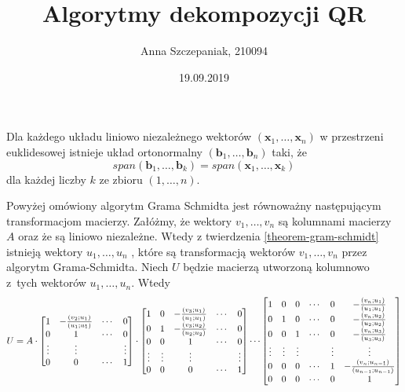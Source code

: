 \documentclass[notheorems]{beamer}
\author{Anna Szczepaniak, 210094}
\title{Algorytmy dekompozycji QR}
\date{19.09.2019}
\institute{Praca licencjacka przygotowana pod opieką dr inż. Piotra Kowalskiego}
\newcommand{\vr}[1]{\mathbf{#1}}
\newcommand{\mx}[1]{{#1}}
\newcommand{\proj}[2]{\frac{\scalar{#2}{#1}}{\scalar{#1}{#1}}}
\begin{document}
\begin{frame}
\titlepage
\end{frame}


\begin{frame}
\begin{theorem} \label{theorem-gram-schmidt}
Dla każdego układu liniowo niezależnego wektorów $(\vr{x}_{1},\ldots,\vr{x}_{n})$ w przestrzeni euklidesowej istnieje układ ortonormalny $(\vr{b}_{1},\ldots, \vr{b}_{n})$ taki, że 
$$
span(\vr{b}_{1},\ldots, \vr{b}_{k}) = span(\vr{x}_{1},\ldots, \vr{x}_{k})
$$
dla każdej liczby $k$ ze zbioru $(1,\ldots,n)$.
\end{theorem}
\end{frame}


\begin{frame}
\begin{lemma} \label{lemma-matrix-formulation-of-gs}
Powyżej omówiony algorytm Grama Schmidta jest równoważny następującym transformacjom macierzy. Załóżmy, że wektory $v_{1}, \ldots, v_n$ są kolumnami macierzy $\mx{A}$ oraz że są liniowo niezależne. Wtedy z twierdzenia \ref{theorem-gram-schmidt} istnieją wektory $u_1, \ldots, u_n$ , które są transformacją wektorów $v_1, \ldots, v_n$ przez algorytm Grama-Schmidta. Niech $\mx{U}$ będzie macierzą utworzoną kolumnowo z~tych wektorów $u_1, \ldots, u_n$. Wtedy
{\tiny
$$
U = A \cdot 
\begin{bmatrix}
1 & -\proj{u_1}{v_2} & \cdots & 0 \\
0 & 1 & \cdots & 0 \\
\vdots & \vdots & & \vdots \\
0 & 0 & \cdots & 1
\end{bmatrix} \cdot
\begin{bmatrix}
1 & 0 & -\proj{u_1}{v_3} &\cdots & 0 \\
0 & 1 & -\proj{u_2}{v_3} &\cdots & 0 \\
0 & 0 & 1 & \cdots & 0 \\
\vdots & \vdots & \vdots &  & \vdots \\
0 & 0 & 0 & \cdots & 1
\end{bmatrix}
 \cdots
\begin{bmatrix}
1 & 0 & 0 & \cdots & 0 & -\proj{u_1}{v_n} \\
0 & 1 & 0 & \cdots & 0 &-\proj{u_2}{v_n} \\
0 & 0 & 1 & \cdots & 0 & -\proj{u_3}{v_n} \\
\vdots & \vdots & \vdots &  & \vdots & \vdots \\
0 & 0 & 0 & \cdots & 1 & -\proj{u_{n-1}}{v_n} \\
0 & 0 & 0 & \cdots & 0 & 1
\end{bmatrix}
$$ 
}
\end{lemma}
\end{frame}
\end{document}
